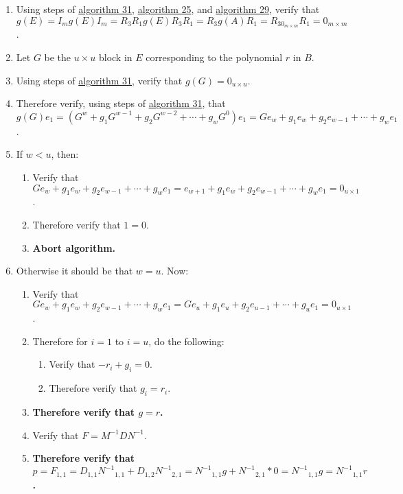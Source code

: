 \documentclass[twocolumn]{article}
\begin{document}
\begin{enumerate}
				\item Using steps of \hyperref[sec:algorithm 31]{algorithm 31}, \hyperref[sec:algorithm 25]{algorithm 25}, and \hyperref[sec:algorithm 29]{algorithm 29}, verify that $g(E)=I_mg(E)I_m=R_3R_1g(E)R_3R_1=R_3g(A)R_1=R_30_{m\times m}R_1=0_{m\times m}$.
				\item Let $G$ be the $u\times u$ block in $E$ corresponding to the polynomial $r$ in $B$.
				\item Using steps of \hyperref[sec:algorithm 31]{algorithm 31}, verify that $g(G)=0_{u\times u}$.
				\item Therefore verify, using steps of \hyperref[sec:algorithm 31]{algorithm 31}, that $g(G)e_1=(G^w+g_1G^{w-1}+g_2G^{w-2}+\cdots+g_wG^0)e_1=Ge_w+g_1e_w+g_2e_{w-1}+\cdots+g_we_1$.
				\item If $w<u$, then:
				\begin{enumerate}
					\item Verify that $Ge_w+g_1e_w+g_2e_{w-1}+\cdots+g_we_1=e_{w+1}+g_1e_w+g_2e_{w-1}+\cdots+g_we_1=0_{u\times 1}$.
					\item Therefore verify that $1=0$.
					\item \textbf{Abort algorithm.}
				\end{enumerate}
				\item Otherwise it should be that $w=u$. Now:
				\begin{enumerate}
					\item Verify that $Ge_w+g_1e_w+g_2e_{w-1}+\cdots+g_we_1=Ge_u+g_1e_u+g_2e_{u-1}+\cdots+g_ue_1=0_{u\times 1}$.
					\item Therefore for $i=1$ to $i=u$, do the following:
					\begin{enumerate}
						\item Verify that $-r_i+g_i=0$.
						\item Therefore verify that $g_i=r_i$.
					\end{enumerate}
					\item \textbf{Therefore verify that $g=r$.}
					\item Verify that $F=M^{-1}DN^{-1}$.
					\item \textbf{Therefore verify that $p=F_{1,1}=D_{1,1}{N^{-1}}_{1,1}+D_{1,2}{N^{-1}}_{2,1}={N^{-1}}_{1,1}g+{N^{-1}}_{2,1}*0={N^{-1}}_{1,1}g={N^{-1}}_{1,1}r$.}
				\end{enumerate}
			\end{enumerate}
\end{document}
